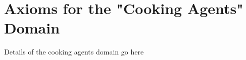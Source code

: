 \chapter{Axioms for the "Cooking Agents" Domain}\label{ch:cookingagents}

Details of the cooking agents domain go here

